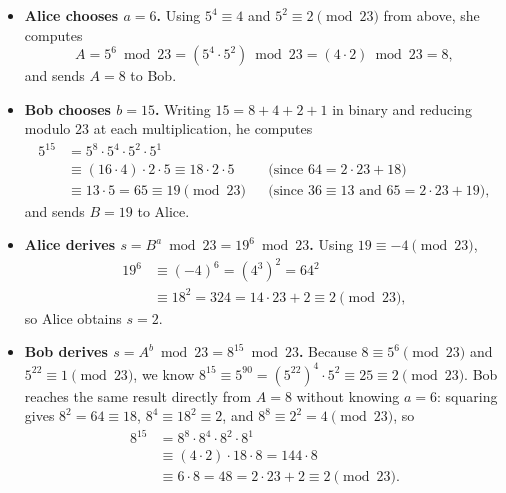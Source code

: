 \begin{itemize}
  \item \textbf{Alice chooses $a = 6$.} Using $5^4 \equiv 4$ and $5^2 \equiv 2 \pmod{23}$ from above, she computes
  \[
    A = 5^6 \bmod 23 = (5^4 \cdot 5^2) \bmod 23 = (4 \cdot 2) \bmod 23 = 8,
  \]
  and sends $A = 8$ to Bob.
  \item \textbf{Bob chooses $b = 15$.} Writing $15 = 8 + 4 + 2 + 1$ in binary and reducing modulo $23$ at each multiplication, he computes
  \begin{align*}
    5^{15} &= 5^8 \cdot 5^4 \cdot 5^2 \cdot 5^1 \\
           &\equiv (16 \cdot 4) \cdot 2 \cdot 5 \equiv 18 \cdot 2 \cdot 5 &&\text{(since $64 = 2 \cdot 23 + 18$)} \\
           &\equiv 13 \cdot 5 = 65 \equiv 19 \pmod{23} &&\text{(since $36 \equiv 13$ and $65 = 2 \cdot 23 + 19$)},
  \end{align*}
  and sends $B = 19$ to Alice.
  \item \textbf{Alice derives $s = B^a \bmod 23 = 19^6 \bmod 23$.} Using $19 \equiv -4 \pmod{23}$,
  \begin{align*}
    19^6 &\equiv (-4)^6 = (4^3)^2 = 64^2 \\
         &\equiv 18^2 = 324 = 14 \cdot 23 + 2 \equiv 2 \pmod{23},
  \end{align*}
  so Alice obtains $s = 2$.
  \item \textbf{Bob derives $s = A^b \bmod 23 = 8^{15} \bmod 23$.} Because $8 \equiv 5^6 \pmod{23}$ and $5^{22} \equiv 1 \pmod{23}$, we know $8^{15} \equiv 5^{90} = (5^{22})^4 \cdot 5^2 \equiv 25 \equiv 2 \pmod{23}$. Bob reaches the same result directly from $A = 8$ without knowing $a = 6$: squaring gives $8^2 = 64 \equiv 18$, $8^4 \equiv 18^2 \equiv 2$, and $8^8 \equiv 2^2 = 4 \pmod{23}$, so
  \begin{align*}
    8^{15} &= 8^8 \cdot 8^4 \cdot 8^2 \cdot 8^1 \\
           &\equiv (4 \cdot 2) \cdot 18 \cdot 8 = 144 \cdot 8 \\
           &\equiv 6 \cdot 8 = 48 = 2 \cdot 23 + 2 \equiv 2 \pmod{23}.
  \end{align*}
\end{itemize}

